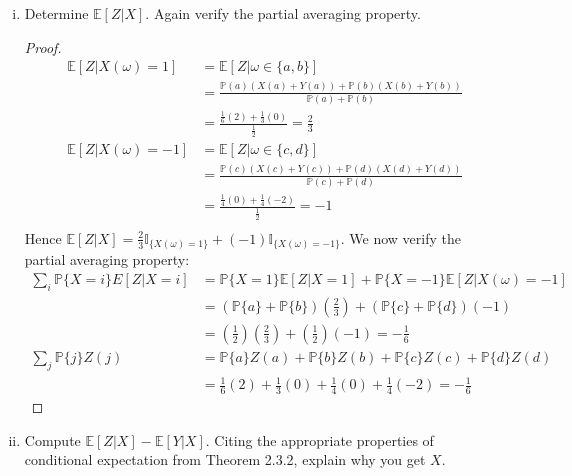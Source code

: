 \documentclass{article}
\newcommand{\p}{\mathbb{P}}
\newcommand{\E}{\mathbb{E}}
\newcommand{\seq}[1]{\{ #1 \}}
\theoremstyle{definition}
\theoremstyle{definition}
\begin{document}
\begin{enumerate}
\begin{enumerate}[(i)]
\begin{proof}
        
        \end{proof}
        \item Determine $\E[Z|X]$. Again verify the partial averaging property.
        \begin{proof}
        \begin{align*}
            \E[Z|X(\omega)=1] &= \E[Z| \omega \in \seq{a,b}]  \\
                            & = \frac{\p(a) (X(a)+Y(a)) + \p(b) (X(b)+Y(b))}{\p(a)+\p(b)} \\
                            &= \frac{\frac{1}{6} (2) + \frac{1}{3}(0)}{\frac{1}{2}} = \frac{2}{3} \\ 
              \E[Z|X(\omega)=-1] &= \E[Z| \omega \in \seq{c,d}]  \\
                            & = \frac{\p(c) (X(c)+Y(c)) + \p(d) (X(d)+Y(d))}{\p(c)+\p(d)} \\
                            &= \frac{\frac{1}{4} (0) + \frac{1}{4}(-2)}{\frac{1}{2}} = -1 \\ 
        \end{align*}
        Hence $\E[Z|X] = \frac{2}{3}\mathbb{I}_{\seq{X(\omega)=1}} + (-1) \mathbb{I}_{\seq{X(\omega)=-1}} $. We now verify the partial averaging property:
        \begin{align*}
        \sum_{i} \p\seq{X=i}E[Z|X=i] &= \p\seq{X=1}\E[Z|X=1]+\p\seq{X=-1}\E[Z|X(\omega)=-1] \\
        &= (\p\seq{a}+\p\seq{b}) \left( \frac{2}{3} \right) + (\p\seq{c}+\p\seq{d}) \left( -1\right)  \\
        &= \left( \frac{1}{2} \right) \left( \frac{2}{3} \right) +\left( \frac{1}{2} \right) \left( -1 \right) = -\frac{1}{6} \\
        \sum_j \p\seq{j} Z(j) &=  \p\seq{a}Z(a)+\p\seq{b}Z(b)+\p\seq{c}Z(c)+\p\seq{d}Z(d) \\
        &= \frac{1}{6}(2) + \frac{1}{3}(0) + \frac{1}{4}(0)+\frac{1}{4}(-2) = -\frac{1}{6}
        \end{align*}
        \end{proof}
        \item Compute $\E[Z|X] - \E[Y|X]$. Citing the appropriate properties of conditional expectation from Theorem 2.3.2, explain why you get $X$.
        

\end{enumerate}
\end{enumerate}
\end{document}

